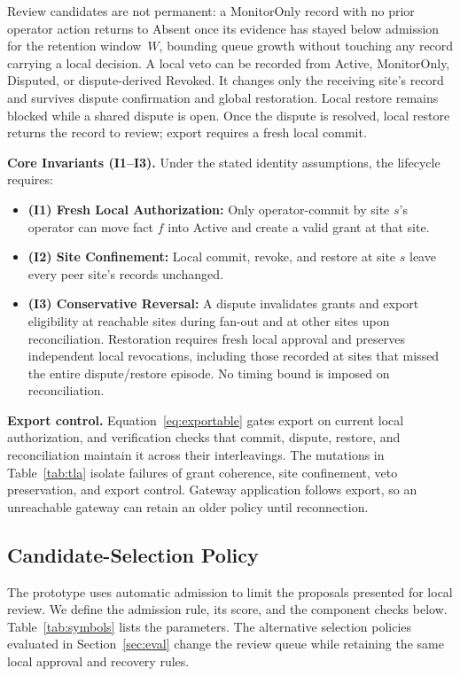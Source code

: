 \documentclass[journal]{IEEEtran}
\theoremstyle{definition}
\begin{document}
Review candidates are not permanent: a MonitorOnly record with no prior operator action returns to Absent once its evidence has stayed below admission for the retention window~$W$, bounding queue growth without touching any record carrying a local decision. A local veto can be recorded from Active, MonitorOnly, Disputed, or dispute-derived Revoked. It changes only the receiving site's record and survives dispute confirmation and global restoration. Local restore remains blocked while a shared dispute is open. Once the dispute is resolved, local restore returns the record to review; export requires a fresh local commit.

\textbf{Core Invariants (I1--I3).} Under the stated identity assumptions, the lifecycle requires:
\begin{itemize}
\item \textbf{(I1) Fresh Local Authorization:} Only operator-commit by site $s$'s operator can move fact $f$ into Active and create a valid grant at that site.
\item \textbf{(I2) Site Confinement:} Local commit, revoke, and restore at site $s$ leave every peer site's records unchanged.
\item \textbf{(I3) Conservative Reversal:} A dispute invalidates grants and export eligibility at reachable sites during fan-out and at other sites upon reconciliation. Restoration requires fresh local approval and preserves independent local revocations, including those recorded at sites that missed the entire dispute/restore episode. No timing bound is imposed on reconciliation.
\end{itemize}

\textbf{Export control.} Equation~\ref{eq:exportable} gates export on current local authorization, and verification checks that commit, dispute, restore, and reconciliation maintain it across their interleavings. The mutations in Table~\ref{tab:tla} isolate failures of grant coherence, site confinement, veto preservation, and export control. Gateway application follows export, so an unreachable gateway can retain an older policy until reconnection.

\subsection{Candidate-Selection Policy}
\label{sec:scoring}
The prototype uses automatic admission to limit the proposals presented for local review. We define the admission rule, its score, and the component checks below. Table~\ref{tab:symbols} lists the parameters. The alternative selection policies evaluated in Section~\ref{sec:eval} change the review queue while retaining the same local approval and recovery rules.
\end{document}
